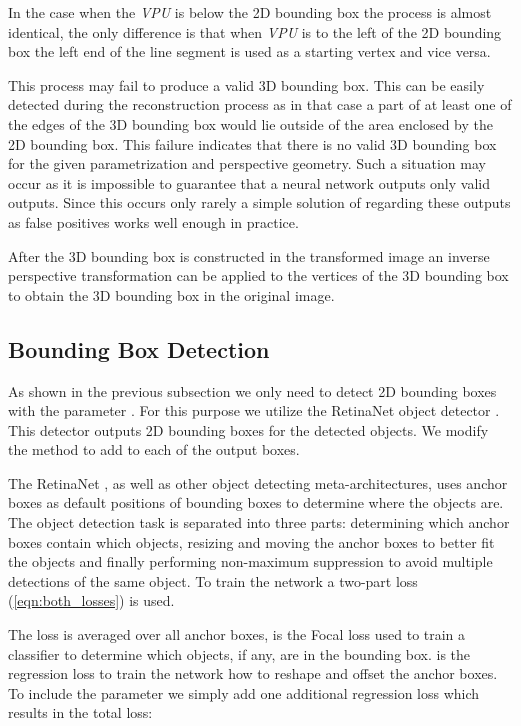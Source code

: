 \documentclass[twocolumn]{svjour3}          \smartqed  \usepackage{graphicx}
\begin{document}
In the case when the \textit{VPU} is below the 2D bounding box the process is almost identical, the only difference is that when \textit{VPU} is to the left of the 2D bounding box the left end of the  line segment is used as a starting vertex and vice versa.

This process may fail to produce a valid 3D bounding box. This can be easily detected during the reconstruction process as in that case a part of at least one of the edges of the 3D bounding box would lie outside of the area enclosed by the 2D bounding box. This failure indicates that there is no valid 3D bounding box for the given parametrization and perspective geometry. Such a situation may occur as it is impossible to guarantee that a neural network outputs only valid outputs. Since this occurs only rarely a simple solution of regarding these outputs as false positives works well enough in practice.

After the 3D bounding box is constructed in the transformed image an inverse perspective transformation can be applied to the vertices of the 3D bounding box to obtain the 3D bounding box in the original image.

\subsection{Bounding Box Detection}

As shown in the previous subsection we only need to detect 2D bounding boxes with the parameter . For this purpose we utilize the RetinaNet object detector \cite{RetinaNet}. This detector outputs 2D bounding boxes for the detected objects. We modify the method to add  to each of the output boxes.

The RetinaNet \cite{RetinaNet}, as well as other object detecting meta-architectures, uses anchor boxes as default positions of bounding boxes to determine where the objects are. The object detection task is separated into three parts: determining which anchor boxes contain which objects, resizing and moving the anchor boxes to better fit the objects and finally performing non-maximum suppression to avoid multiple detections of the same object. To train the network a two-part loss (\ref{eqn:both_losses}) is used.



The loss is averaged over all  anchor boxes,  is the Focal loss used to train a classifier to determine which objects, if any, are in the bounding box.  is the regression loss to train the network how to reshape and offset the anchor boxes. To include the parameter  we simply add one additional regression loss which results in the total loss:
\end{document}
